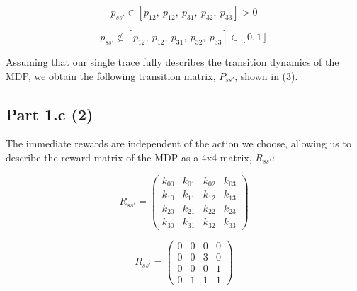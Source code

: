 \documentclass[12pt]{article}
\begin{document}
\begin{minipage}{.5\textwidth}
    \noindent
    \begin{equation}
        p_{ss'} \in [p_{12},\ p_{12},\ p_{31},\ p_{32},\ p_{33}] > 0
    \end{equation}
\end{minipage}
\begin{minipage}{.5\textwidth}
    \noindent
    \begin{equation}
        p_{ss'} \not\in [p_{12},\ p_{12},\ p_{31},\ p_{32},\ p_{33}] \in [0,1]
    \end{equation}
\end{minipage}
\vspace{0.1em}

Assuming that our single trace fully describes the transition dynamics of the MDP, we obtain the following transition matrix, \(P_{ss'}\), shown in (3).

\subsection*{Part 1.c (2)}
The immediate rewards are independent of the action we choose, allowing us to describe the reward matrix of the MDP as a 4x4 matrix, \(R_{ss'}\):\vspace{1em}

\begin{minipage}{.5\textwidth}
    \begin{equation}
    R_{ss'} = 
        \begin{pmatrix}
            k_{00} & k_{01} & k_{02} & k_{03}\\
            k_{10} & k_{11} & k_{12} & k_{13}\\
            k_{20} & k_{21} & k_{22} & k_{23}\\
            k_{30} & k_{31} & k_{32} & k_{33}
        \end{pmatrix}
    \end{equation}
\end{minipage}
\begin{minipage}{.5\textwidth}
    \begin{equation}
    R_{ss'} = 
        \begin{pmatrix}
            0 & 0 & 0 & 0\\
            0 & 0 & 3 & 0\\
            0 & 0 & 0 & 1\\
            0 & 1 & 1 & 1
        \end{pmatrix}
    \end{equation}
\end{minipage}
\vspace{1em}
\end{document}
